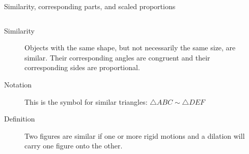 \begin{frame}{Similarity, corresponding parts, and scaled proportions}
  \begin{columns}
      \begin{description}
        \item[Similarity] Objects with the same shape, but not necessarily the same size, are similar. Their corresponding angles are congruent and their corresponding sides are proportional.
        \item[Notation] This is the symbol for similar triangles: $\triangle ABC \sim \triangle DEF$
        \item[Definition] Two figures are similar if one or more rigid motions and a dilation will carry one figure onto the other.
      \end{description}
    \begin{flushright}
    \end{flushright}
  \end{columns}
\end{frame}

